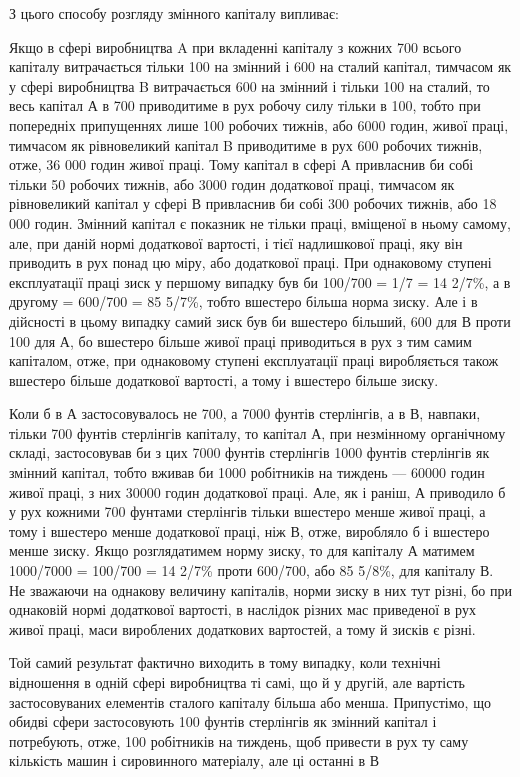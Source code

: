З цього способу розгляду змінного капіталу випливає:

Якщо в сфері виробництва A при вкладенні капіталу з кожних 700 всього капіталу витрачається тільки
100 на змінний
і 600 на сталий капітал, тимчасом як у сфері виробництва B
витрачається 600 на змінний і тільки 100 на сталий, то весь
капітал А в 700 приводитиме в рух робочу силу тільки в 100,
тобто при попередніх припущеннях лише 100 робочих тижнів,
або 6000 годин, живої праці, тимчасом як рівновеликий капітал B приводитиме в рух 600 робочих
тижнів, отже, 36 000 годин живої праці. Тому капітал в сфері А привласнив би собі тільки
50 робочих тижнів, або 3000 годин додаткової праці, тимчасом
як рівновеликий капітал у сфері В привласнив би собі 300 робочих тижнів, або 18 000 годин. Змінний
капітал є показник не
тільки праці, вміщеної в ньому самому, але, при даній нормі
додаткової вартості, і тієї надлишкової праці, яку він приводить
в рух понад цю міру, або додаткової праці. При однаковому
ступені експлуатації праці зиск у першому випадку був би 100/700 = 1/7 = 14 2/7\%, а в другому =
600/700 = 85 5/7\%, тобто вшестеро
більша норма зиску. Але і в дійсності в цьому випадку самий
зиск був би вшестеро більший, 600 для В проти 100 для А, бо
вшестеро більше живої праці приводиться в рух з тим самим
капіталом, отже, при однаковому ступені експлуатації праці
виробляється також вшестеро більше додаткової вартості, а тому
і вшестеро більше зиску.

Коли б в А застосовувалось не 700, а 7000 фунтів стерлінгів, а в В, навпаки, тільки 700 фунтів
стерлінгів капіталу, то
капітал А, при незмінному органічному складі, застосовував би
з цих 7000 фунтів стерлінгів 1000 фунтів стерлінгів як змінний
капітал, тобто вживав би 1000 робітників на тиждень — 60000 годин живої праці, з них 30000 годин
додаткової праці. Але,
як і раніш, А приводило б у рух кожними 700 фунтами стерлінгів тільки вшестеро менше живої праці, а
тому і вшестеро
менше додаткової праці, ніж В, отже, виробляло б і вшестеро
менше зиску. Якщо розглядатимем норму зиску, то для капіталу А матимем 1000/7000 = 100/700 = 14 2/7\%
проти 600/700, або 85 5/8\%, для
капіталу В. Не зважаючи на однакову величину капіталів, норми
зиску в них тут різні, бо при однаковій нормі додаткової
вартості, в наслідок різних мас приведеної в рух живої праці,
маси вироблених додаткових вартостей, а тому й зисків є різні.

Той самий результат фактично виходить в тому випадку, коли
технічні відношення в одній сфері виробництва ті самі, що й
у другій, але вартість застосовуваних елементів сталого капіталу більша або менша. Припустімо, що
обидві сфери застосовують 100 фунтів стерлінгів як змінний капітал і потребують, отже, 100
робітників на тиждень, щоб привести в рух ту саму
кількість машин і сировинного матеріалу, але ці останні в В
\parbreak{}  %
